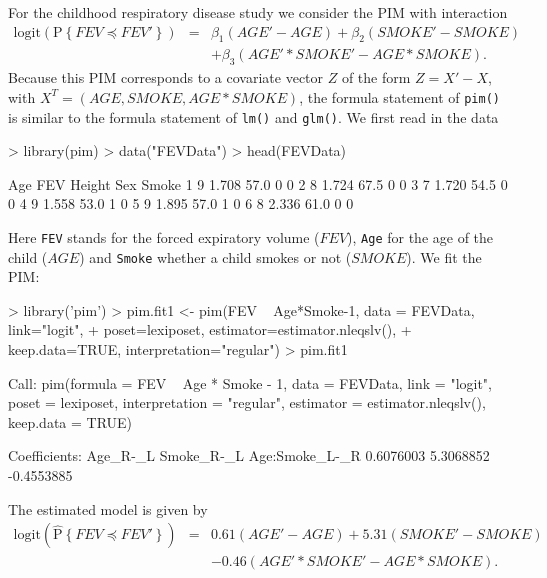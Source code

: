 \documentclass[12pt]{article}
\newcommand{\prob}[1]{\text{P}\left\{#1\right\}}
\newcommand{\hatprob}[1]{\hat{\text{P}}\left\{#1\right\}}
\newcommand{\leqs}{\preccurlyeq}
\begin{document}
For the childhood respiratory disease study we consider the PIM with interaction
\begin{eqnarray*}
\text{logit} \left( \prob{FEV \leqs FEV' } \right) &=& \beta_1 (AGE' - AGE) + \beta_2(SMOKE' - SMOKE) \\ 
												   & &  + \beta_3 (AGE'*SMOKE' - AGE*SMOKE). 
\end{eqnarray*}
Because this PIM corresponds to a covariate vector $Z$ of the form $Z = X' -X$, with $X^T = (AGE, SMOKE, AGE*SMOKE)$, the formula statement of \texttt{pim()} is similar to the formula statement of \texttt{lm()} and \texttt{glm()}. We first read in the data
\begin{Schunk}
\begin{Sinput}
> library(pim)
> data("FEVData")
> head(FEVData)
\end{Sinput}
\begin{Soutput}
  Age   FEV Height Sex Smoke
1   9 1.708   57.0   0     0
2   8 1.724   67.5   0     0
3   7 1.720   54.5   0     0
4   9 1.558   53.0   1     0
5   9 1.895   57.0   1     0
6   8 2.336   61.0   0     0
\end{Soutput}
\end{Schunk}
Here \verb|FEV| stands for the forced expiratory volume ($FEV$), \verb|Age| for the age of the child ($AGE$) and \verb|Smoke| whether a child smokes or not ($SMOKE$). We fit the PIM:
\begin{Schunk}
\begin{Sinput}
> library('pim')
> pim.fit1 <- pim(FEV ~ Age*Smoke-1, data = FEVData, link="logit", 
+   poset=lexiposet, estimator=estimator.nleqslv(), 
+   keep.data=TRUE, interpretation="regular")
> pim.fit1
\end{Sinput}
\begin{Soutput}
Call:
pim(formula = FEV ~ Age * Smoke - 1, data = FEVData, link = "logit", 
    poset = lexiposet, interpretation = "regular", estimator = estimator.nleqslv(), 
    keep.data = TRUE)

Coefficients:
      Age_R-_L     Smoke_R-_L Age:Smoke_L-_R 
     0.6076003      5.3068852     -0.4553885 
\end{Soutput}
\end{Schunk}
The estimated model is given by
\begin{eqnarray*}
\text{logit} \left( \hatprob{FEV \leqs FEV' } \right) &=& 0.61 (AGE' - AGE) + 5.31(SMOKE' - SMOKE) \\ 
												   & &   -0.46 (AGE'*SMOKE' - AGE*SMOKE). 
\end{eqnarray*}
\end{document}
